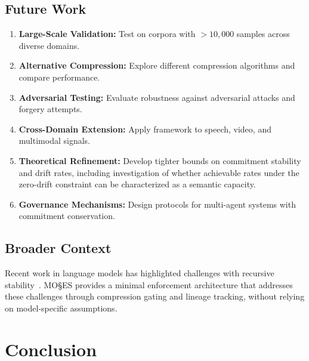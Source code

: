 \documentclass[11pt,a4paper]{article}
\begin{document}
\subsection{Future Work}

\begin{enumerate}
    \item \textbf{Large-Scale Validation:} Test on corpora with $>10{,}000$ samples across diverse domains.

    \item \textbf{Alternative Compression:} Explore different compression algorithms and compare performance.

    \item \textbf{Adversarial Testing:} Evaluate robustness against adversarial attacks and forgery attempts.

    \item \textbf{Cross-Domain Extension:} Apply framework to speech, video, and multimodal signals.

    \item \textbf{Theoretical Refinement:} Develop tighter bounds on commitment stability and drift rates, including investigation of whether achievable rates under the zero-drift constraint can be characterized as a semantic capacity.

    \item \textbf{Governance Mechanisms:} Design protocols for multi-agent systems with commitment conservation.
\end{enumerate}

\subsection{Broader Context}

Recent work in language models has highlighted challenges with recursive stability~\cite{correa2025,xie2025,chang2025,zhang2025,guo2025,chen2026}. MO\S{}ES\texttrademark{} provides a minimal enforcement architecture that addresses these challenges through compression gating and lineage tracking, without relying on model-specific assumptions.

\section{Conclusion}
\label{sec:conclusion}
\end{document}

